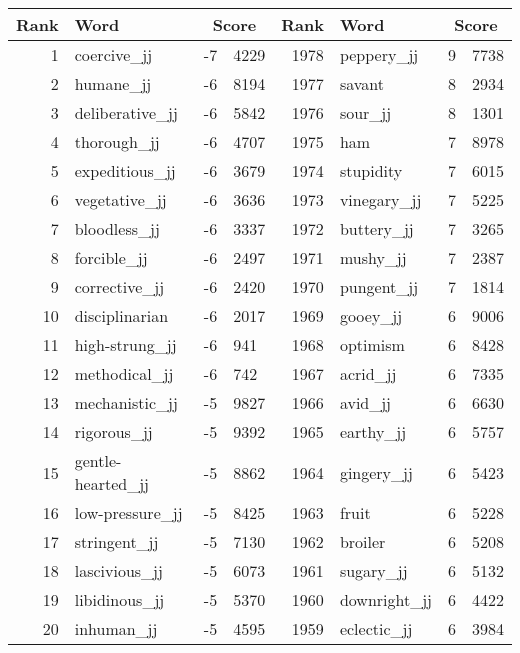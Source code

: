 \begin{table}[tbp]
    \begin{tabular}{| rlr@{.}l | rlr@{.}l |}
    \hline
    \textbf{Rank} & \textbf{Word} & \multicolumn{2}{c|}{\textbf{Score}} & \textbf{Rank} & \textbf{Word} & \multicolumn{2}{c|}{\textbf{Score}} \\
    \hline
    1 & coercive\_jj & -7 & 4229    &    1978 & peppery\_jj & 9 & 7738 \\
    2 & humane\_jj & -6 & 8194    &    1977 & savant & 8 & 2934 \\
    3 & deliberative\_jj & -6 & 5842    &    1976 & sour\_jj & 8 & 1301 \\
    4 & thorough\_jj & -6 & 4707    &    1975 & ham & 7 & 8978 \\
    5 & expeditious\_jj & -6 & 3679    &    1974 & stupidity & 7 & 6015 \\
    6 & vegetative\_jj & -6 & 3636    &    1973 & vinegary\_jj & 7 & 5225 \\
    7 & bloodless\_jj & -6 & 3337    &    1972 & buttery\_jj & 7 & 3265 \\
    8 & forcible\_jj & -6 & 2497    &    1971 & mushy\_jj & 7 & 2387 \\
    9 & corrective\_jj & -6 & 2420    &    1970 & pungent\_jj & 7 & 1814 \\
    10 & disciplinarian & -6 & 2017    &    1969 & gooey\_jj & 6 & 9006 \\
    11 & high-strung\_jj & -6 & 941    &    1968 & optimism & 6 & 8428 \\
    12 & methodical\_jj & -6 & 742    &    1967 & acrid\_jj & 6 & 7335 \\
    13 & mechanistic\_jj & -5 & 9827    &    1966 & avid\_jj & 6 & 6630 \\
    14 & rigorous\_jj & -5 & 9392    &    1965 & earthy\_jj & 6 & 5757 \\
    15 & gentle-hearted\_jj & -5 & 8862    &    1964 & gingery\_jj & 6 & 5423 \\
    16 & low-pressure\_jj & -5 & 8425    &    1963 & fruit & 6 & 5228 \\
    17 & stringent\_jj & -5 & 7130    &    1962 & broiler & 6 & 5208 \\
    18 & lascivious\_jj & -5 & 6073    &    1961 & sugary\_jj & 6 & 5132 \\
    19 & libidinous\_jj & -5 & 5370    &    1960 & downright\_jj & 6 & 4422 \\
    20 & inhuman\_jj & -5 & 4595    &    1959 & eclectic\_jj & 6 & 3984 \\

\end{tabular}
\end{table}
